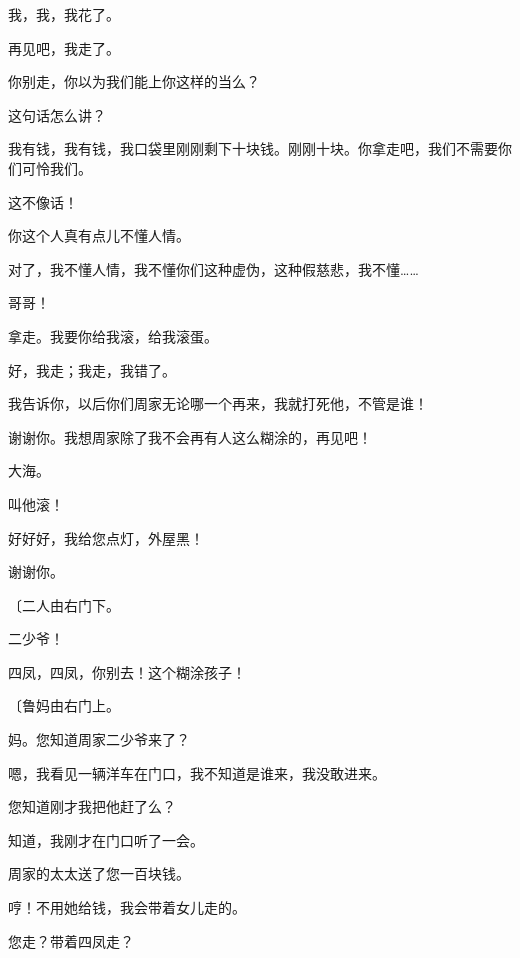 我，我，我花了。

再见吧，我走了。

你别走，你以为我们能上你这样的当么？

这句话怎么讲？

我有钱，我有钱，我口袋里刚刚剩下十块钱。刚刚十块。你拿走吧，我们不需要你们可怜我们。

这不像话！

你这个人真有点儿不懂人情。

对了，我不懂人情，我不懂你们这种虚伪，这种假慈悲，我不懂……

哥哥！

拿走。我要你给我滚，给我滚蛋。

好，我走；我走，我错了。

我告诉你，以后你们周家无论哪一个再来，我就打死他，不管是谁！

谢谢你。我想周家除了我不会再有人这么糊涂的，再见吧！

大海。

叫他滚！

好好好，我给您点灯，外屋黑！

谢谢你。

{\fangsong〔二人由右门下。}

二少爷！

四凤，四凤，你别去！这个糊涂孩子！

{\fangsong〔鲁妈由右门上。}

妈。您知道周家二少爷来了？

嗯，我看见一辆洋车在门口，我不知道是谁来，我没敢进来。

您知道刚才我把他赶了么？

知道，我刚才在门口听了一会。

周家的太太送了您一百块钱。

哼！不用她给钱，我会带着女儿走的。

您走？带着四凤走？

